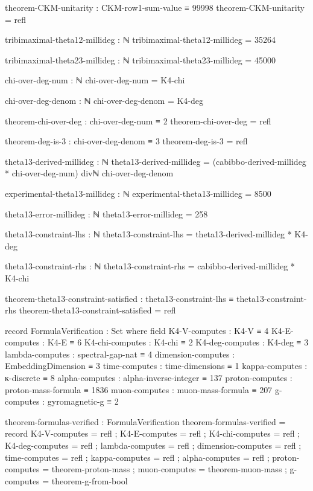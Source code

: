 \documentclass[11pt,a4paper]{book}
\begin{document}
\begin{code}
theorem-CKM-unitarity : CKM-row1-sum-value ≡ 99998
theorem-CKM-unitarity = refl

tribimaximal-theta12-millideg : ℕ
tribimaximal-theta12-millideg = 35264

tribimaximal-theta23-millideg : ℕ
tribimaximal-theta23-millideg = 45000


chi-over-deg-num : ℕ
chi-over-deg-num = K4-chi

chi-over-deg-denom : ℕ
chi-over-deg-denom = K4-deg

theorem-chi-over-deg : chi-over-deg-num ≡ 2
theorem-chi-over-deg = refl

theorem-deg-is-3 : chi-over-deg-denom ≡ 3
theorem-deg-is-3 = refl

theta13-derived-millideg : ℕ
theta13-derived-millideg = (cabibbo-derived-millideg * chi-over-deg-num) divℕ chi-over-deg-denom

experimental-theta13-millideg : ℕ
experimental-theta13-millideg = 8500

theta13-error-millideg : ℕ
theta13-error-millideg = 258

theta13-constraint-lhs : ℕ
theta13-constraint-lhs = theta13-derived-millideg * K4-deg

theta13-constraint-rhs : ℕ  
theta13-constraint-rhs = cabibbo-derived-millideg * K4-chi

theorem-theta13-constraint-satisfied : theta13-constraint-lhs ≡ theta13-constraint-rhs
theorem-theta13-constraint-satisfied = refl

record FormulaVerification : Set where
  field
    K4-V-computes        : K4-V ≡ 4
    K4-E-computes        : K4-E ≡ 6
    K4-chi-computes      : K4-chi ≡ 2
    K4-deg-computes      : K4-deg ≡ 3
    lambda-computes      : spectral-gap-nat ≡ 4
    dimension-computes   : EmbeddingDimension ≡ 3
    time-computes        : time-dimensions ≡ 1
    kappa-computes       : κ-discrete ≡ 8
    alpha-computes       : alpha-inverse-integer ≡ 137
    proton-computes      : proton-mass-formula ≡ 1836
    muon-computes        : muon-mass-formula ≡ 207
    g-computes           : gyromagnetic-g ≡ 2

theorem-formulas-verified : FormulaVerification
theorem-formulas-verified = record
  { K4-V-computes = refl
  ; K4-E-computes = refl
  ; K4-chi-computes = refl
  ; K4-deg-computes = refl
  ; lambda-computes = refl
  ; dimension-computes = refl
  ; time-computes = refl
  ; kappa-computes = refl
  ; alpha-computes = refl
  ; proton-computes = theorem-proton-mass
  ; muon-computes = theorem-muon-mass
  ; g-computes = theorem-g-from-bool
  }



\end{code}
\end{document}
